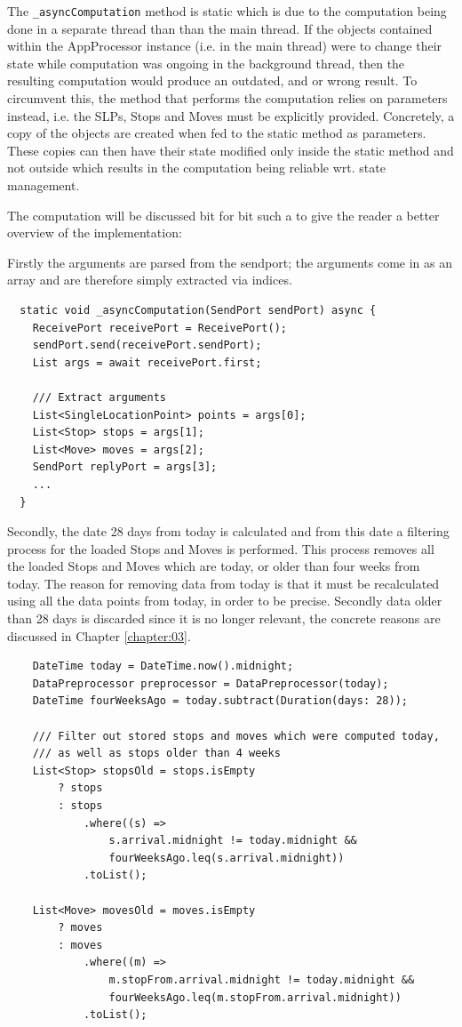 The \verb|_asyncComputation| method is static which is due to the computation being done in a separate thread than than the main thread. If the objects contained within the AppProcessor instance (i.e. in the main thread) were to change their state while computation was ongoing in the background thread, then the resulting computation would produce an outdated, and or wrong result. To circumvent this, the method that performs the computation relies on parameters instead, i.e. the SLPs, Stops and Moves must be explicitly provided. Concretely, a copy of the objects are created when fed to the static method as parameters. These copies can then have their state modified only inside the static method and not outside which results in the computation being reliable wrt. state management. 

The computation will be discussed bit for bit such a to give the reader a better overview of the implementation:

Firstly the arguments are parsed from the sendport; the arguments come in as an array and are therefore simply extracted via indices.
\begin{verbatim}
  static void _asyncComputation(SendPort sendPort) async {
    ReceivePort receivePort = ReceivePort();
    sendPort.send(receivePort.sendPort);
    List args = await receivePort.first;

    /// Extract arguments
    List<SingleLocationPoint> points = args[0];
    List<Stop> stops = args[1];
    List<Move> moves = args[2];
    SendPort replyPort = args[3];
    ...
  }
\end{verbatim}

Secondly, the date 28 days from today is calculated and from this date a filtering process for the loaded Stops and Moves is performed. This process removes all the loaded Stops and Moves which are today, or older than four weeks from today. The reason for removing data from today is that it must be recalculated using all the data points from today, in order to be precise. Secondly data older than 28 days is discarded since it is no longer relevant, the concrete reasons are discussed in Chapter \ref{chapter:03}.
\begin{verbatim}
    DateTime today = DateTime.now().midnight;
    DataPreprocessor preprocessor = DataPreprocessor(today);
    DateTime fourWeeksAgo = today.subtract(Duration(days: 28));

    /// Filter out stored stops and moves which were computed today,
    /// as well as stops older than 4 weeks
    List<Stop> stopsOld = stops.isEmpty
        ? stops
        : stops
            .where((s) =>
                s.arrival.midnight != today.midnight &&
                fourWeeksAgo.leq(s.arrival.midnight))
            .toList();

    List<Move> movesOld = moves.isEmpty
        ? moves
        : moves
            .where((m) =>
                m.stopFrom.arrival.midnight != today.midnight &&
                fourWeeksAgo.leq(m.stopFrom.arrival.midnight))
            .toList();
\end{verbatim}

